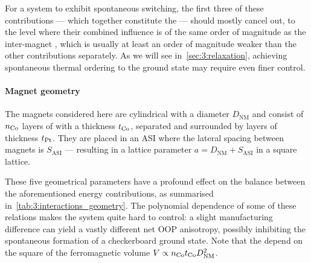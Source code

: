 For a system to exhibit spontaneous switching, the first three of these contributions --- which together constitute the  --- should mostly cancel out, to the level where their combined influence is of the same order of magnitude as the inter-magnet , which is usually at least an order of magnitude weaker than the other contributions separately.
As we will see in~\cref{sec:3:relaxation}, achieving spontaneous thermal ordering to the ground state may require even finer control.

\paragraph{Magnet geometry}\label{sec:3:OOP_geometry}
The magnets considered here are cylindrical with a diameter $D_\mathrm{NM}$ and consist of $n_{\ce{Co}}$ layers of  with a thickness $t_{\ce{Co}}$, separated and surrounded by  layers of thickness $t_{\ce{Pt}}$.
They are placed in an ASI where the lateral spacing between magnets is $S_\mathrm{ASI}$ --- resulting in a lattice parameter $a=D_\mathrm{NM}+S_\mathrm{ASI}$ in a square lattice. \par
These five geometrical parameters have a profound effect on the balance between the aforementioned energy contributions, as summarised in~\cref{tab:3:interactions_geometry}.
The polynomial dependence of some of these relations makes the system quite hard to control: a slight manufacturing difference can yield a vastly different net OOP anisotropy, possibly inhibiting the spontaneous formation of a checkerboard ground state.
Note that the  depend on the square of the ferromagnetic volume $V \propto n_{\ce{Co}} t_{\ce{Co}} D_\mathrm{NM}^2$.

\vspace{-1em}

